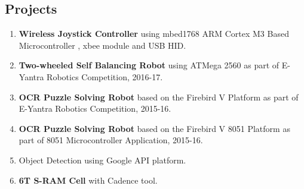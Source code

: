 \documentclass[margin,line]{res}
\begin{document}
\begin{resume}
\section{\sc Projects}
\begin{enumerate}
	\item \textbf{Wireless Joystick Controller} using mbed1768 ARM Cortex M3 Based Microcontroller , xbee module and USB HID.
	\item \textbf{Two-wheeled Self Balancing Robot} using ATMega 2560 as part of E-Yantra Robotics Competition, 2016-17.
	\item \textbf{OCR Puzzle Solving Robot} based on the Firebird V Platform as part of E-Yantra Robotics Competition, 2015-16.
	\item \textbf{OCR Puzzle Solving Robot} based on the Firebird V 8051 Platform as part of 8051 Microcontroller Application, 2015-16.	
	\item Object Detection using Google API platform.
	\item \textbf{6T S-RAM Cell} with Cadence tool.		    
\end{enumerate}

\end{resume}
\end{document}
